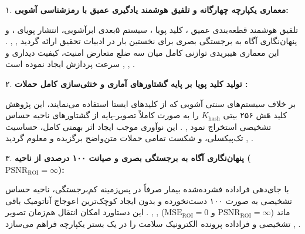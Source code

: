 

۱. \textbf{معماری یکپارچه چهارگانه و تلفیق هوشمند یادگیری عمیق با رمزشناسی آشوبی:}\par

تلفیق هوشمند قطعه‌بندی عمیق ، کلید پویا ، سیستم ۵بعدی ابرآشوبی، انتشار پویای ، و پنهان‌نگاری آگاه به برجستگی بصری  برای نخستین بار در ادبیات تحقیق ارائه گردید , , . این معماری هیبریدی توازنی کامل میان سه ضلع متعارض امنیت، کیفیت دیداری و سرعت پردازش ایجاد نموده است , , .\par



۲. \textbf{تولید کلید پویا بر پایه گشتاورهای آماری  و خنثی‌سازی کامل حملات :}\par

بر خلاف سیستم‌های سنتی آشوبی که از کلیدهای ایستا استفاده می‌نمایند، این پژوهش کلید هَش ۲۵۶ بیتی $K_{\mathrm{hash}}$ را به صورت کاملاً تصویر{-}پایه از گشتاورهای ناحیه حساس تشخیصی استخراج نمود , . این نوآوری موجب ایجاد اثر بهمنی کامل، حساسیت تک‌پیکسلی، و شکست تمامی حملات متن‌واضح برگزیده  و معلوم  گردید , .\par



۳. \textbf{پنهان‌نگاری آگاه به برجستگی بصری و صیانت ۱۰۰ درصدی از ناحیه  ($\mathrm{PSNR}_{\mathrm{ROI}} = \infty$):}\par

با جای‌دهی فراداده فشرده‌شده  بیمار صرفاً در پس‌زمینه کم‌برجستگی، ناحیه حساس تشخیصی به صورت ۱۰۰ دست‌نخورده و بدون ایجاد کوچک‌ترین اعوجاج آناتومیک باقی ماند ($\mathrm{PSNR}_{\mathrm{ROI}} = \infty$ و $\mathrm{MSE}_{\mathrm{ROI}} = 0$) , , . این دستاورد امکان انتقال هم‌زمان تصویر تشخیصی و فراداده پرونده الکترونیک سلامت  را در یک بستر یکپارچه فراهم می‌سازد , .\par

